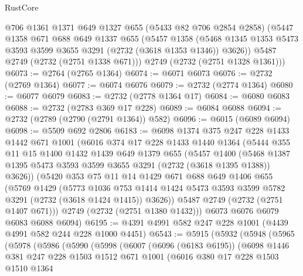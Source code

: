 \begin{lexlean}{RustCore}
\begin{coremodule}
      @706
      @1361
      @1371
      @649
      @1327
      @655
      (@5433 @82 @706 @2854 @2858)
      (@5447
        @1358
        @671
        @688
        @649
        @1337
        @655
        (@5457
          @1358
          (@5468 @1345 @1353 @5473 @3593 @3599 @3655 @3291 (@2732 (@3618 @1353 @1346)) @3626))
        @5487
        @2749
        (@2732 (@2751 @1338 @671)))
      @2749
      (@2732 (@2751 @1328 @1361)))
@6073 := @2764 (@2765 @1364)
@6074 := @6071 @6073
@6076 := @2732 (@2769 @1364)
@6077 := @6074 @6076
@6079 := @2732 (@2774 @1364)
@6080 := @6077 @6079
@6083 := @2732 (@2778 @1364 @17)
@6084 := @6080 @6083
@6088 := @2732 (@2783 @369 @17 @228)
@6089 := @6084 @6088
@6094 := @2732 (@2789 (@2790 (@2791 @1364)) @582)
@6096 := @6015 (@6089 @6094)
@6098 := @5509 @692 @2806
@6183 := @6098
    @1374
    @375
    @247
    @228
    @1433
    @1442
    @671
    @1001
    (@6016
      @374
      @17
      @228
      @1433
      @1440
      @1364
      (@5444
        @355
        @11
        @15
        @1400
        @1432
        @1439
        @649
        @1379
        @655
        (@5457
          @1400
          (@5468 @1387 @1395 @5473 @3593 @3599 @3655 @3291 (@2732 (@3618 @1395 @1388)) @3626))
        (@5420
          @353
          @75
          @11
          @14
          @1429
          @671
          @688
          @649
          @1406
          @655
          (@5769
            @1429
            (@5773
              @1036
              @753
              @1414
              @1424
              @5473
              @3593
              @3599
              @5782
              @3291
              (@2732 (@3618 @1424 @1415))
              @3626))
          @5487
          @2749
          (@2732 (@2751 @1407 @671)))
        @2749
        (@2732 (@2751 @1380 @1432)))
      @6073
      @6076
      @6079
      @6083
      @6088
      @6094)
@6195 := @4391 @4991 @582 @247 @228 @1001 (@4439 @4991 @582 @244 @228 @1000 @4451)
@6543 := @5915
    (@5932
      (@5948
        (@5965
          (@5978
            (@5986
              (@5990
                (@5998
                  (@6007
                    (@6096 (@6183 @6195))
                    (@6098
                      @1446
                      @381
                      @247
                      @228
                      @1503
                      @1512
                      @671
                      @1001
                      (@6016
                        @380
                        @17
                        @228
                        @1503
                        @1510
                        @1364

\end{coremodule}
\end{lexlean}
